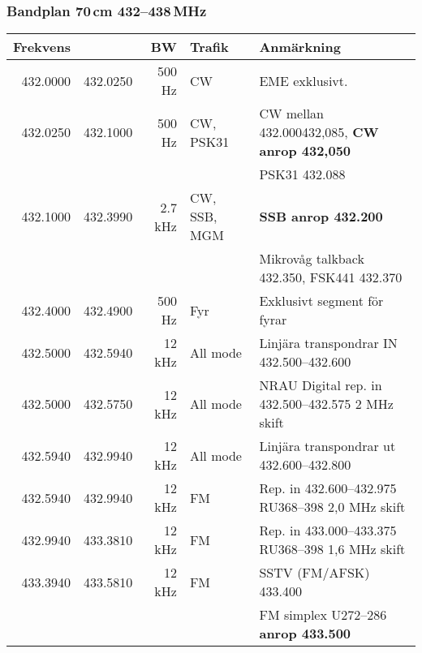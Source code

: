 \subsubsection{Bandplan 70\,cm 432--438\,MHz}
\begin{tabular}{rrrll}
	\textbf{Frekvens} &          & \textbf{BW} & \textbf{Trafik} & \textbf{Anmärkning}                                         \\ \hline
	
	
	         432.0000 & 432.0250 & 500 Hz  & CW           & EME exklusivt.                                               \\ \hline
	         432.0250 & 432.1000 & 500 Hz  & CW, PSK31    & CW mellan \num{432,000}{432,085}, \textbf{CW anrop 432,050}  \\
	                  &          &         &              & PSK31 \num{432,088}                                          \\ \hline
	         432.1000 & 432.3990 & 2.7 kHz & CW, SSB, MGM & \textbf{SSB anrop \num{432,200}}                             \\
	                  &          &         &              & Mikrovåg talkback \num{432,350}, FSK441 \num{432,370}        \\ \hline
	         432.4000 & 432.4900 & 500 Hz  & Fyr          & Exklusivt segment för fyrar                                  \\ \hline
	         432.5000 & 432.5940 & 12 kHz  & All mode     & Linjära transpondrar IN \numrange{432,500}{432,600}          \\ \hline
	         432.5000 & 432.5750 & 12 kHz  & All mode     & NRAU Digital rep. in \numrange{432,500}{432,575} 2 MHz skift \\ \hline
	         432.5940 & 432.9940 & 12 kHz  & All mode     & Linjära transpondrar ut \numrange{432,600}{432,800}          \\ \hline
	         432.5940 & 432.9940 & 12 kHz  & FM           & Rep. in \numrange{432,600}{432,975} RU368--398 2,0 MHz skift \\ \hline
	         432.9940 & 433.3810 & 12 kHz  & FM           & Rep. in \numrange{433,000}{433,375} RU368--398 1,6 MHz skift \\ \hline
	         433.3940 & 433.5810 & 12 kHz  & FM           & SSTV (FM/AFSK) \num{433,400}                                 \\
	                  &          &         &              & FM simplex U272--286 \textbf{anrop \num{433,500}}            \\ \hline

\end{tabular}
